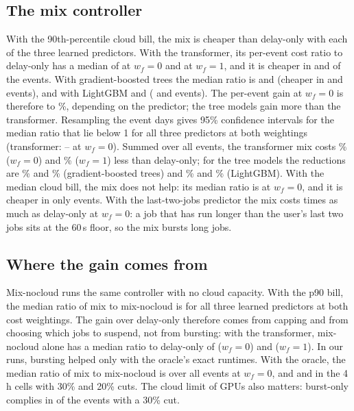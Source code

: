 \subsection{The mix controller}
\label{sec:mixctl}
With the 90th-percentile cloud bill, the mix is cheaper than delay-only with each of the three learned predictors. With the transformer, its per-event cost ratio to delay-only has a median of \MixPNineOverDelayZero{} at $w_f=0$ and \MixPNineOverDelayOne{} at $w_f=1$, and it is cheaper in \MixPNineOverDelayCheaperZero{} and \MixPNineOverDelayCheaperOne{} of the \SetupEventsFeasible{} events. With gradient-boosted trees the median ratio is \SetGbdtMainMixOverDelayZero{} and \SetGbdtMainMixOverDelayOne{} (cheaper in \SetGbdtMainCheaperZero{} and \SetGbdtMainCheaperOne{} events), and with LightGBM \SetLightgbmMainMixOverDelayZero{} and \SetLightgbmMainMixOverDelayOne{} (\SetLightgbmMainCheaperZero{} and \SetLightgbmMainCheaperOne{} events). The per-event gain at $w_f=0$ is therefore \LearnedGainMinPct{} to \LearnedGainMaxPct\%, depending on the predictor; the tree models gain more than the transformer.
Resampling the \BootDays{} event days gives 95\% confidence intervals for the median ratio that lie below 1 for all three predictors at both weightings (transformer: \BootTransLoZero{}--\BootTransHiZero{} at $w_f=0$).
Summed over all events, the transformer mix costs \SetTransMainReductionPctZero\% ($w_f=0$) and \SetTransMainReductionPctOne\% ($w_f=1$) less than delay-only; for the tree models the reductions are \SetGbdtMainReductionPctZero\% and \SetGbdtMainReductionPctOne\% (gradient-boosted trees) and \SetLightgbmMainReductionPctZero\% and \SetLightgbmMainReductionPctOne\% (LightGBM). With the median cloud bill, the mix does not help: its median ratio is \MixOverDelayZero{} at $w_f=0$, and it is cheaper in only \MixOverDelayCheaperZero{} events. With the last-two-jobs predictor the mix costs \MixLastTwoOverDelayZero{} times as much as delay-only at $w_f=0$: a job that has run longer than the user's last two jobs sits at the 60\,s floor, so the mix bursts long jobs.

\subsection{Where the gain comes from}
Mix-nocloud runs the same controller with no cloud capacity. With the p90 bill, the median ratio of mix to mix-nocloud is \LearnedMixOverNocloudMax{} for all three learned predictors at both cost weightings. The gain over delay-only therefore comes from capping and from choosing which jobs to suspend, not from bursting: with the transformer, mix-nocloud alone has a median ratio to delay-only of \NocloudOverDelayZero{} ($w_f=0$) and \NocloudOverDelayOne{} ($w_f=1$).
In our runs, bursting helped only with the oracle's exact runtimes. With the oracle, the median ratio of mix to mix-nocloud is \MixOverNocloudOracleZero{} over all events at $w_f=0$, and \MixOverNocloudOracleFourThirtyZero{} and \MixOverNocloudOracleFourTwentyZero{} in the 4\,h cells with 30\% and 20\% cuts.
The cloud limit of \SetupCloudCapGpus{} GPUs also matters: burst-only complies in \BurstThirtyCompliantEvents{} of the \BurstThirtyEvents{} events with a 30\% cut.

